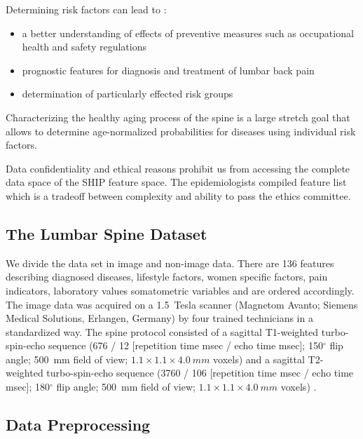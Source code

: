 \documentclass[journal]{style/vgtc} 			          %
\begin{document}
%
Determining risk factors can lead to \cite{Fletcher2012}:
\begin{itemize}
	\item a better understanding of effects of preventive measures such as occupational health and safety regulations
	\item prognostic features for diagnosis and treatment of lumbar back pain
	\item determination of particularly effected risk groups
\end{itemize}
%
Characterizing the healthy aging process of the spine is a large stretch goal that allows to determine age-normalized probabilities for diseases using individual risk factors.

Data confidentiality and ethical reasons prohibit us from accessing the complete data space of the SHIP feature space.
%
The epidemiologists compiled feature list which is a tradeoff between complexity and ability to pass the ethics committee.
%
%
\subsection{The Lumbar Spine Dataset}
We divide the data set in image and non-image data.
%
There are 136 features describing diagnosed diseases, lifestyle factors, women specific factors, pain indicators, laboratory values somatometric variables and are ordered accordingly.
%
The image data was acquired on a 1.5~Tesla scanner (Magnetom Avanto; Siemens Medical Solutions, Erlangen, Germany) by four trained technicians in a standardized way.
%
The spine protocol consisted of a sagittal T1-weighted turbo-spin-echo sequence (676 / 12 [repetition time msec / echo time msec]; 150$^\circ$ flip angle; 500~mm field of view; $1.1\times1.1\times4.0~mm$ voxels) and a sagittal T2-weighted turbo-spin-echo sequence (3760 / 106 [repetition time msec / echo time msec]; 180$^\circ$ flip angle; 500~mm field of view; $1.1\times1.1\times4.0~mm$ voxels) \cite{Hegenscheid2013}.

\subsection{Data Preprocessing} \label{Data Preprocessing}
\end{document}
